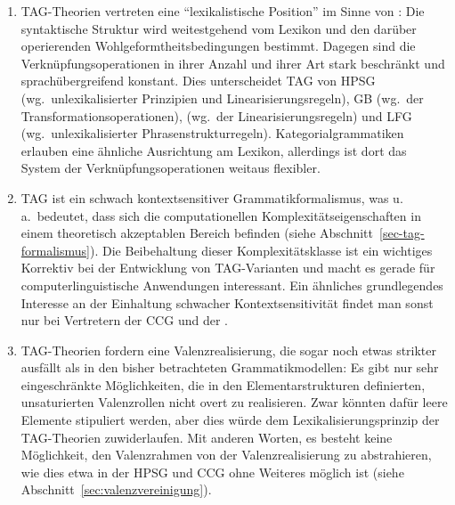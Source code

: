 {\setlength{\leftmargini}{15pt}
\begin{enumerate}
  \item TAG-Theorien vertreten eine "`lexikalistische Position"' im Sinne von \cite{Wunderlich:85}: Die syntaktische Struktur wird weitestgehend vom Lexikon und den darüber operierenden Wohlgeformtheitsbedingungen bestimmt. Dagegen sind die Verknüpfungsoperationen in ihrer Anzahl und ihrer Art stark beschränkt und sprachübergreifend konstant. Dies unterscheidet TAG von HPSG (wg.\ unlexikalisierter Prinzipien und Linearisierungsregeln), GB (wg.\ der Transformationsoperationen),  (wg.\ der Linearisierungsregeln) und LFG (wg.\ unlexikalisierter Phrasenstrukturregeln). Kategorialgrammatiken erlauben eine ähnliche Ausrichtung am Lexikon, allerdings ist dort das System der Verknüpfungsoperationen weitaus flexibler.
  
  \item TAG ist ein schwach kontextsensitiver Grammatikformalismus, was u.\,a.\ bedeutet, dass sich die computationellen Komplexitätseigenschaften in einem theoretisch akzeptablen Bereich befinden (siehe Abschnitt~\ref{sec-tag-formalismus}). Die Beibehaltung dieser Komplexitätsklasse ist ein wichtiges Korrektiv bei der Entwicklung von TAG-Varianten und macht es gerade für computerlinguistische Anwendungen interessant. Ein ähnliches grundlegendes Interesse an der Einhaltung schwacher Kontextsensitivität findet man sonst nur bei Vertretern der CCG \citep[22f]{Steedman:00} und der  \citep{Stabler:97,Michaelis:01a,Michaelis:01b}.

  \item TAG-Theorien fordern eine Valenzrealisierung, die sogar noch etwas strikter ausfällt als in den bisher betrachteten Grammatikmodellen: Es gibt nur sehr eingeschränkte Möglichkeiten, die in den Elementarstrukturen definierten, unsaturierten Valenzrollen nicht overt zu realisieren. Zwar könnten dafür leere Elemente stipuliert werden, aber dies würde dem Lexikalisierungsprinzip der TAG-Theorien zuwiderlaufen. Mit anderen Worten, es besteht keine Möglichkeit, den Valenzrahmen von der Valenzrealisierung zu abstrahieren, wie dies etwa in der HPSG und CCG ohne Weiteres möglich ist (siehe Abschnitt~\ref{sec:valenzvereinigung}).   
 
\end{enumerate}
}
